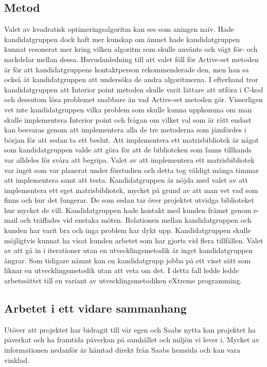 \subsection{Metod}
Valet av kvadratisk optimeringsalgoritm kan ses som aningen naiv. Hade kandidatgruppen dock haft mer kunskap om ämnet hade kandidatgruppen kunnat resonerat mer kring vilken algoritm som skulle använts och vägt för- och nackdelar mellan dessa. Huvudanledning till att valet föll för Active-set metoden är för att kandidatgruppens kontaktperson rekommenderade den, men han sa också åt kandidatgruppen att undersöka de andra algoritmerna. I efterhand tror kandidatgruppen att Interior point metoden skulle varit lättare att utföra i C-kod och dessutom lösa problemet snabbare än vad Active-set metoden gör. Visserligen vet inte kandidatgruppen vilka problem som skulle kunna uppkomma om man skulle implementera Interior point och frågan om vilket val som är rätt endast kan besvaras genom att implementera alla de tre metoderna som jämfördes i början för att sedan ta ett beslut.
\newline
\newline
Att implementera ett matrisbibliotek är något som kandidatgruppen valde att göra för att de biblioteken som fanns tillhands var alldeles för svåra att begripa. Valet av att implementera ett matrisbibliotek var inget som var planerat under förstudien och detta tog väldigt många timmar att implementera samt att testa. Kandidatgruppen är nöjda med valet av att implementera ett eget matrisbibliotek, mycket på grund av att man vet vad som finns och hur det fungerar. De som sedan tar över projektet utvidga biblioteket hur mycket de vill.
\newline
\newline
Kandidatgruppen hade kontakt med kunden främst genom e-mail och träffades vid enstaka möten. Relationen mellan kandidatgruppen och kunden har varit bra och inga problem har dykt upp. Kandidatgruppen skulle möjligtvis kunnat ha visat kunden arbetet som har gjorts vid flera tillfällen. 
\newline
\newline
Valet av att gå in i iterationer utan en utvecklingsmetodik är inget kandidatgruppen ångrar. Som tidigare nämnt kan en kandidatgrupp jobba på ett visst sätt som liknar en utvecklingsmetodik utan att veta om det. I detta fall ledde ledde arbetssättet till en variant av utvecklingsmetodiken eXtreme programming.

\subsection{Arbetet i ett vidare sammanhang}
Utöver att projektet har bidragit till vår egen och Saabs nytta kan projektet ha påverkat och ha framtida påverkan på samhället och miljön vi lever i. Mycket av informationen nedanför är hämtad direkt från Saabs hemsida och kan vara vinklad.   

